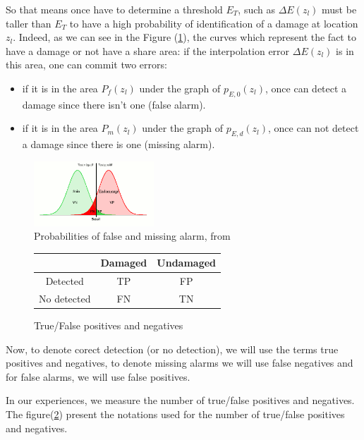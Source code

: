\documentclass[journal]{IEEEtran}
\begin{document}
So that means once have to determine a threshold $E_T$, such as $ \Delta E(z_l)$ must be taller than $E_T$ to have a high probability of identification of a damage at location $z_l$. Indeed, as we can see in the Figure (\ref{proba}), the curves which represent the fact to have a damage or not have a share area: if the interpolation error $ \Delta E(z_l)$ is in this area, one can commit two errors:
\begin{itemize}
\item if it is in the area $P_f(z_l)$ under the graph of $p_{E,0}(z_l)$, once can detect a damage since there isn't one (false alarm).
\item if it is in the area $P_m(z_l)$ under the graph of $p_{E,d}(z_l)$, once can not detect a damage since there is one (missing alarm).
\end{itemize}


\begin{figure}[h!]
  \centering
  \includegraphics[width=0.4\textwidth]{images/explication_FP.png}
  \caption{Probabilities of false and missing alarm, from \cite{dilena2015damage}}
  \label{proba}
\end{figure}

\begin{figure}[h!]
\begin{center}
\begin{tabular}{|c|c|c|}
\hline
\ & Damaged & Undamaged \\ \hline
Detected & TP & FP \\ \hline
No detected & FN & TN \\ \hline
\end{tabular}
\end{center}
\caption{True/False positives and negatives}
\label{TFPN}
\end{figure}

Now, to denote corect detection (or no detection), we will use the terms true positives and negatives, to denote missing alarms we will use false negatives and for false alarms, we will use false positives.

In our experiences, we measure the number of true/false positives and negatives. The figure(\ref{TFPN}) present the notations used for the number of true/false positives and negatives.
\end{document}
